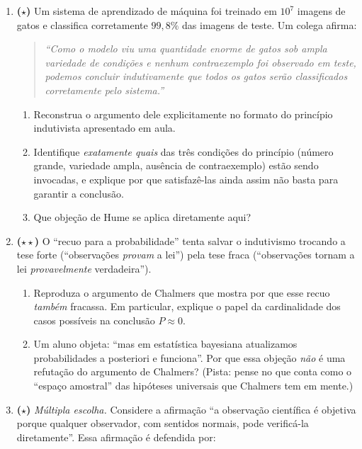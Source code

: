 \documentclass[10pt,a4paper]{extarticle}
\newcommand{\impt}[1]{\textcolor{important}{#1}}
\newcommand{\difi}{$\star$}
\newcommand{\difii}{$\star\star$}
\begin{document}
\begin{enumerate}[label=\textbf{\arabic*.}, leftmargin=*]

\item \textbf{(\difi)} Um sistema de aprendizado de máquina foi treinado em $10^7$ imagens de gatos e classifica corretamente $99{,}8\%$ das imagens de teste. Um colega afirma:

\begin{quote}
\itshape ``Como o modelo viu uma quantidade enorme de gatos sob ampla variedade de condições e nenhum contraexemplo foi observado em teste, podemos concluir indutivamente que \emph{todos} os gatos serão classificados corretamente pelo sistema.''
\end{quote}

\begin{enumerate}[label=(\alph*)]
    \item Reconstrua o argumento dele explicitamente no formato do \impt{princípio indutivista} apresentado em aula.
    \item Identifique \emph{exatamente quais} das três condições do princípio (número grande, variedade ampla, ausência de contraexemplo) estão sendo invocadas, e explique por que satisfazê-las ainda assim não basta para garantir a conclusão.
    \item Que objeção de Hume se aplica diretamente aqui?
\end{enumerate}

\item \textbf{(\difii)} O ``recuo para a probabilidade'' tenta salvar o indutivismo trocando a tese forte (``observações \emph{provam} a lei'') pela tese fraca (``observações tornam a lei \emph{provavelmente} verdadeira'').

\begin{enumerate}[label=(\alph*)]
    \item Reproduza o argumento de Chalmers que mostra por que esse recuo \emph{também} fracassa. Em particular, explique o papel da cardinalidade dos casos possíveis na conclusão $P \approx 0$.
    \item Um aluno objeta: ``mas em estatística bayesiana atualizamos probabilidades a posteriori e funciona''. Por que essa objeção \emph{não} é uma refutação do argumento de Chalmers? (Pista: pense no que conta como o ``espaço amostral'' das hipóteses universais que Chalmers tem em mente.)
\end{enumerate}

\item \textbf{(\difi)} \emph{Múltipla escolha.} Considere a afirmação ``a observação científica é objetiva porque qualquer observador, com sentidos normais, pode verificá-la diretamente''. Essa afirmação é defendida por:


\end{enumerate}
\end{document}

